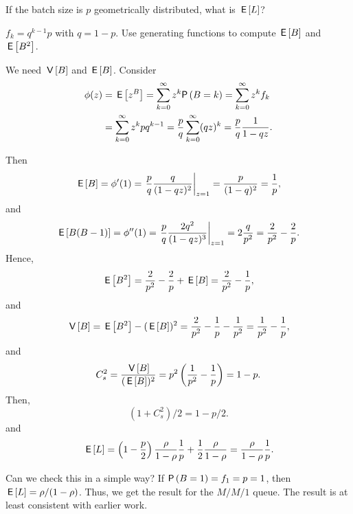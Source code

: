 \begin{exercise}
  If the batch size is $p$ geometrically distributed, what is $\,\mathsf{E}\left[L\right]$?
  \begin{hint}
$f_k=q^{k-1}p$ with $q=1-p$. Use generating functions to compute $\,\mathsf{E}\left[B\right]$ and $\,\mathsf{E}\left[B^2\right]$.
  \end{hint}
\begin{solution}
  We need $\,\mathsf{V}\left[B\right]$ and $\,\mathsf{E}\left[B\right]$. Consider
  \begin{equation*}
    \begin{split}
    \phi(z) 
&= \E{z^B} = \sum_{k=0}^\infty z^k \P{B=k} = \sum_{k=0}^\infty z^k f_k \\
&= \sum_{k=0}^\infty z^k p q^{k-1} 
= \frac p q \sum_{k=0}^\infty (q z)^k = \frac p q \frac1{1-q z}.
    \end{split}
  \end{equation*}

Then
\begin{equation*}
  \,\mathsf{E}\left[B\right] = \phi'(1) = \left.\frac p q \frac q{(1-q z)^2}\right|_{z=1}= \frac p{(1-q)^2} = \frac 1 p,
\end{equation*}
and
\begin{equation*}
  \,\mathsf{E}\left[B(B-1)\right] = \phi''(1) = \left.\frac p q \frac{2q^2}{(1-q z)^3}\right|_{z=1}= 2 \frac{q}{p^2}= \frac2{p^2} - \frac 2p.
\end{equation*}
Hence, 
\begin{equation*}
  \,\mathsf{E}\left[B^2\right] = \frac2{p^2} - \frac 2p + \,\mathsf{E}\left[B\right] = \frac2{p^2} - \frac1p,
\end{equation*}
and
\begin{equation*}
  \,\mathsf{V}\left[B\right] = \,\mathsf{E}\left[B^2\right] - (\,\mathsf{E}\left[B\right])^2 = \frac2{p^2} - \frac1p - \frac1{p^2} = \frac1{p^2}-\frac1p,
\end{equation*}
and
\begin{equation*}
  C_s^2= \frac{\,\mathsf{V}\left[B\right]}{(\,\mathsf{E}\left[B\right])^2} = p^2 \left(\frac1{p^2}-\frac1p\right)=1-p.
\end{equation*}
Then,
\begin{equation*}
  (1+C_s^2)/2= 1-p/2.
\end{equation*}
and 
\begin{equation*}
  \,\mathsf{E}\left[L\right] = 
\left(1-\frac p2\right) \frac\rho{1-\rho} \frac 1 p + \frac12\frac\rho{1-\rho}
=\frac\rho{1-\rho} \frac 1 p.
\end{equation*}

Can we check this in a simple way? If $\P{B=1}=f_1 = p =1$, then
$\,\mathsf{E}\left[L\right]=\rho/(1-\rho)$. Thus, we get the result for the $M/M/1$
queue. The result is at least consistent with earlier work.
\end{solution}
\end{exercise}

